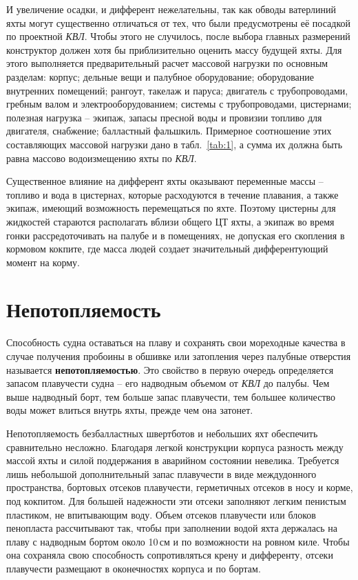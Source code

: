 \documentclass[a4paper, 12pt, twoside, final, book, russian, fittopage, cyremdash]{ncc}
\begin{document}
И увеличение осадки, и дифферент нежелательны, так как обводы ватерлиний яхты могут существенно отличаться от тех, что были предусмотрены её посадкой по проектной \textit{КВЛ}. Чтобы этого не случилось, после выбора главных размерений конструктор должен хотя бы приблизительно оценить массу будущей яхты. Для этого выполняется предварительный расчет массовой нагрузки по основным разделам: корпус; дельные вещи и палубное оборудование; оборудование внутренних помещений; рангоут, такелаж и паруса; двигатель с трубопроводами, гребным валом и электрооборудованием; системы с трубопроводами, цистернами; полезная нагрузка \--- экипаж, запасы пресной воды и провизии топливо для двигателя, снабжение; балластный фальшкиль. Примерное соотношение этих составляющих массовой нагрузки дано в табл.~\ref{tab:1}, а сумма их должна быть равна массово водоизмещению яхты по \textit{КВЛ}.

Существенное влияние на дифферент яхты оказывают переменные массы \--- топливо и вода в цистернах, которые расходуются в течение плавания, а также экипаж, имеющий возможность перемещаться по яхте. Поэтому цистерны для жидкостей стараются располагать вблизи общего ЦТ яхты, а экипаж во время гонки рассредоточивать на палубе и в помещениях, не допуская его скопления в кормовом кокпите, где масса людей создает значительный дифферентующий момент на корму.

\section{Непотопляемость}

Способность судна оставаться на плаву и сохранять свои мореходные качества в случае получения пробоины в обшивке или затопления через палубные отверстия называется \textbf{непотопляемостью}. Это свойство в первую очередь определяется запасом плавучести судна \--- его надводным объемом от \textit{КВЛ} до палубы. Чем выше надводный борт, тем больше запас плавучести, тем большее количество воды может влиться внутрь яхты, прежде чем она затонет.

Непотопляемость безбалластных швертботов и небольших яхт обеспечить сравнительно несложно. Благодаря легкой конструкции корпуса разность между массой яхты и силой поддержания в аварийном состоянии невелика. Требуется лишь небольшой дополнительный запас плавучести в виде междудонного пространства, бортовых отсеков плавучести, герметичных отсеков в носу и корме, под кокпитом. Для большей надежности эти отсеки заполняют легким пенистым пластиком, не впитывающим воду. Объем отсеков плавучести или блоков пенопласта рассчитывают так, чтобы при заполнении водой яхта держалась на плаву с надводным бортом около 10\,см и по возможности на ровном киле. Чтобы она сохраняла свою способность сопротивляться крену и дифференту, отсеки плавучести размещают в оконечностях корпуса и по бортам. 
\end{document}
